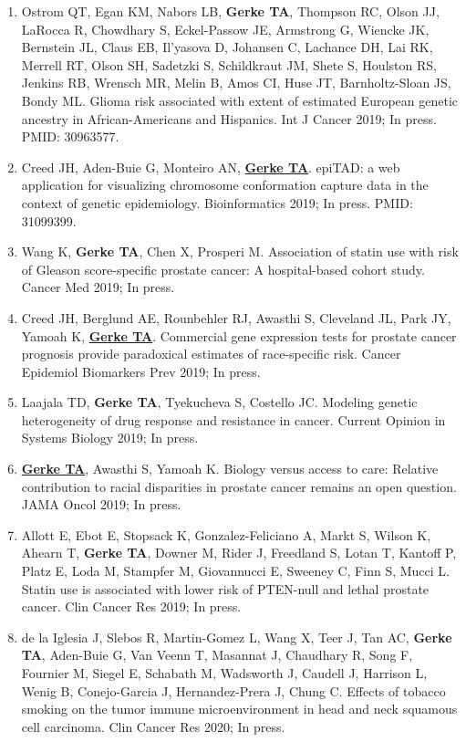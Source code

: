 \documentclass[11pt, a4paper]{article} %
\begin{document}
\begin{enumerate}[leftmargin=*]
\item{} Ostrom QT, Egan KM, Nabors LB, {\bf Gerke TA}, Thompson RC, Olson JJ, LaRocca R, Chowdhary S, Eckel-Passow JE, Armstrong G, Wiencke JK, Bernstein JL, Claus EB, Il'yasova D, Johansen C, Lachance DH, Lai RK, Merrell RT, Olson SH, Sadetzki S, Schildkraut JM, Shete S, Houlston RS, Jenkins RB, Wrensch MR, Melin B, Amos CI, Huse JT, Barnholtz-Sloan JS, Bondy ML. Glioma risk associated with extent of estimated European genetic ancestry in African-Americans and Hispanics. Int J Cancer 2019; In press. PMID: 30963577.

\item{} Creed JH, Aden-Buie G, Monteiro AN, \underline{{\bf Gerke TA}}. epiTAD: a web application for visualizing chromosome conformation capture data in the context of genetic epidemiology. Bioinformatics 2019; In press. PMID: 31099399. 

\item{} Wang K, {\bf Gerke TA}, Chen X, Prosperi M. Association of statin use with risk of Gleason score-specific prostate cancer: A hospital-based cohort study. Cancer Med 2019; In press.

\item{} Creed JH, Berglund AE, Rounbehler RJ, Awasthi S, Cleveland JL, Park JY, Yamoah K, \underline{{\bf Gerke TA}}. Commercial gene expression tests for prostate cancer prognosis provide paradoxical estimates of race-specific risk. Cancer Epidemiol Biomarkers Prev 2019; In press.

\item{} Laajala TD, {\bf Gerke TA}, Tyekucheva S, Costello JC. Modeling genetic heterogeneity of drug response and resistance in cancer. Current Opinion in Systems Biology 2019; In press.

\item{} \underline{{\bf Gerke TA}}, Awasthi S, Yamoah K. Biology versus access to care: Relative contribution to racial disparities in prostate cancer remains an open question. JAMA Oncol 2019; In press.

\item{} Allott E, Ebot E, Stopsack K, Gonzalez-Feliciano A, Markt S, Wilson K, Ahearn T, {\bf Gerke TA}, Downer M, Rider J, Freedland S, Lotan T, Kantoff P, Platz E, Loda M, Stampfer M, Giovannucci E, Sweeney C, Finn S, Mucci L. Statin use is associated with lower risk of PTEN-null and lethal prostate cancer. Clin Cancer Res 2019; In press.

\item{} de la Iglesia J, Slebos R, Martin-Gomez L, Wang X, Teer J, Tan AC, {\bf Gerke TA}, Aden-Buie G, Van Veenn T, Masannat J, Chaudhary R, Song F, Fournier M, Siegel E, Schabath M, Wadsworth J, Caudell J, Harrison L, Wenig B, Conejo-Garcia J, Hernandez-Prera J, Chung C. Effects of tobacco smoking on the tumor immune microenvironment in head and neck squamous cell carcinoma. Clin Cancer Res 2020; In press.


\end{enumerate}
\end{document}
